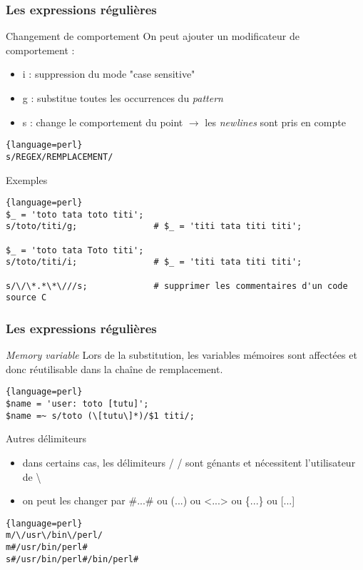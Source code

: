 \begin{frame}[fragile]
  \frametitle{Les expressions régulières}

  \begin{block}{Changement de comportement}
    On peut ajouter un modificateur de comportement :
    \begin{itemize}
    \item i : suppression du mode "case sensitive"
    \item g : substitue toutes les occurrences du \textit{pattern}
    \item s : change le comportement du point $\rightarrow$ les
      \textit{newlines} sont pris en compte
    \end{itemize}
    \begin{lstlisting}{language=perl}
s/REGEX/REMPLACEMENT/
    \end{lstlisting}
  \end{block}

  \begin{exampleblock}{Exemples}
    \begin{lstlisting}{language=perl}
$_ = 'toto tata toto titi';
s/toto/titi/g;               # $_ = 'titi tata titi titi';

$_ = 'toto tata Toto titi';
s/toto/titi/i;               # $_ = 'titi tata titi titi';

s/\/\*.*\*\///s;             # supprimer les commentaires d'un code source C
    \end{lstlisting}
  \end{exampleblock}

\end{frame}

\begin{frame}[fragile]
  \frametitle{Les expressions régulières}

  \begin{block}{\textit{Memory variable}}
    Lors de la substitution, les variables mémoires sont affectées et donc
    réutilisable dans la chaîne de remplacement.
    \begin{lstlisting}{language=perl}
$name = 'user: toto [tutu]';
$name =~ s/toto (\[tutu\]*)/$1 titi/;
    \end{lstlisting}
  \end{block}

  \begin{alertblock}{Autres délimiteurs}
    \begin{itemize}
    \item dans certains cas, les délimiteurs / / sont génants et nécessitent
      l'utilisateur de \textbackslash
    \item on peut les changer par \#...\# ou (...) ou <...> ou \{...\} ou [...]
    \end{itemize}
    \begin{lstlisting}{language=perl}
m/\/usr\/bin\/perl/
m#/usr/bin/perl#
s#/usr/bin/perl#/bin/perl#
    \end{lstlisting}
  \end{alertblock}

\end{frame}

